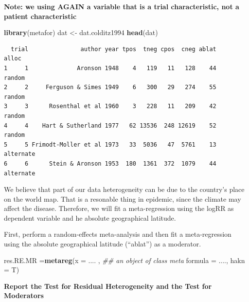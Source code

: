 \documentclass[]{article}
\newenvironment{Shaded}{\begin{snugshade}}{\end{snugshade}}
\newcommand{\CommentTok}[1]{\textcolor[rgb]{0.56,0.35,0.01}{\textit{#1}}}
\newcommand{\DataTypeTok}[1]{\textcolor[rgb]{0.13,0.29,0.53}{#1}}
\newcommand{\KeywordTok}[1]{\textcolor[rgb]{0.13,0.29,0.53}{\textbf{#1}}}
\newcommand{\NormalTok}[1]{#1}
\newcommand{\StringTok}[1]{\textcolor[rgb]{0.31,0.60,0.02}{#1}}
\begin{document}
\textbf{Note: we using AGAIN a variable that is a trial characteristic,
not a patient characteristic}

\begin{Shaded}
\begin{Highlighting}[]
\KeywordTok{library}\NormalTok{(metafor)}
\NormalTok{dat <-}\StringTok{ }\NormalTok{dat.colditz1994}
\KeywordTok{head}\NormalTok{(dat)}
\end{Highlighting}
\end{Shaded}

\begin{verbatim}
  trial               author year tpos  tneg cpos  cneg ablat     alloc
1     1              Aronson 1948    4   119   11   128    44    random
2     2     Ferguson & Simes 1949    6   300   29   274    55    random
3     3      Rosenthal et al 1960    3   228   11   209    42    random
4     4    Hart & Sutherland 1977   62 13536  248 12619    52    random
5     5 Frimodt-Moller et al 1973   33  5036   47  5761    13 alternate
6     6      Stein & Aronson 1953  180  1361  372  1079    44 alternate
\end{verbatim}

We believe that part of our data heterogeneity can be due to the
country's place on the world map. That is a resonable thing in epidemic,
since the climate may affect the disease. Therefore, we will fit a
meta-regression using the logRR as dependent variable and he absolute
geographical latitude.

First, perform a random-effects meta-analysis and then fit a
meta-regression using the absolute geographical latitude (``ablat'') as
a moderator.

\begin{Shaded}
\begin{Highlighting}[]
\NormalTok{res.RE.MR =}\KeywordTok{metareg}\NormalTok{(}\DataTypeTok{x =}\NormalTok{ .... , }\CommentTok{## an object of class meta}
                  \DataTypeTok{formula =}\NormalTok{ ....,}
                  \DataTypeTok{hakn =}\NormalTok{ T)}
\end{Highlighting}
\end{Shaded}

\textbf{Report the Test for Residual Heterogeneity and the Test for
Moderators}

\newline 

\newline 

\newline 
\end{document}
